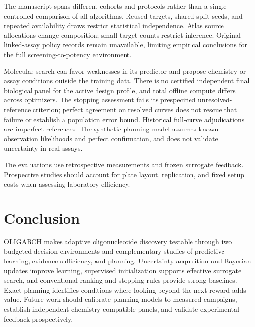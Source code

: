 \documentclass[letterpaper]{article}
\begin{document}
The manuscript spans different cohorts and protocols rather than a single controlled comparison of all algorithms. Reused targets, shared split seeds, and repeated availability draws restrict statistical independence. Atlas source allocations change composition; small target counts restrict inference. Original linked-assay policy records remain unavailable, limiting empirical conclusions for the full screening-to-potency environment.

Molecular search can favor weaknesses in its predictor and propose chemistry or assay conditions outside the training data. There is no certified independent final biological panel for the active design profile, and total offline compute differs across optimizers. The stopping assessment fails its prespecified unresolved-reference criterion; perfect agreement on resolved curves does not rescue that failure or establish a population error bound. Historical full-curve adjudications are imperfect references. The synthetic planning model assumes known observation likelihoods and perfect confirmation, and does not validate uncertainty in real assays.

The evaluations use retrospective measurements and frozen surrogate feedback. Prospective studies should account for plate layout, replication, and fixed setup costs when assessing laboratory efficiency.

\section{Conclusion}
OLIGARCH makes adaptive oligonucleotide discovery testable through two budgeted decision environments and complementary studies of predictive learning, evidence sufficiency, and planning. Uncertainty acquisition and Bayesian updates improve learning, supervised initialization supports effective surrogate search, and conventional ranking and stopping rules provide strong baselines. Exact planning identifies conditions where looking beyond the next reward adds value. Future work should calibrate planning models to measured campaigns, establish independent chemistry-compatible panels, and validate experimental feedback prospectively.

\clearpage

\end{document}
